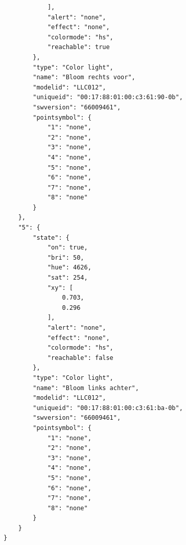 \documentclass[12pt]{article}
\begin{document}
\begin{lstlisting}
            ],
            "alert": "none",
            "effect": "none",
            "colormode": "hs",
            "reachable": true
        },
        "type": "Color light",
        "name": "Bloom rechts voor",
        "modelid": "LLC012",
        "uniqueid": "00:17:88:01:00:c3:61:90-0b",
        "swversion": "66009461",
        "pointsymbol": {
            "1": "none",
            "2": "none",
            "3": "none",
            "4": "none",
            "5": "none",
            "6": "none",
            "7": "none",
            "8": "none"
        }
    },
    "5": {
        "state": {
            "on": true,
            "bri": 50,
            "hue": 4626,
            "sat": 254,
            "xy": [
                0.703,
                0.296
            ],
            "alert": "none",
            "effect": "none",
            "colormode": "hs",
            "reachable": false
        },
        "type": "Color light",
        "name": "Bloom links achter",
        "modelid": "LLC012",
        "uniqueid": "00:17:88:01:00:c3:61:ba-0b",
        "swversion": "66009461",
        "pointsymbol": {
            "1": "none",
            "2": "none",
            "3": "none",
            "4": "none",
            "5": "none",
            "6": "none",
            "7": "none",
            "8": "none"
        }
    }
}
\end{lstlisting}
\newpage
\end{document}
